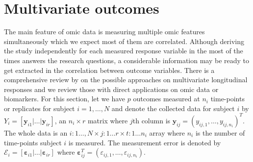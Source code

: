 \documentclass[]{article}
\begin{document}
		
		\section{Multivariate outcomes}
		The main feature of omic data is measuring multiple omic features simultaneously which we expect most of them are correlated. Although deriving the study independently for each measured response variable in the most of the times answers the research questions, a considerable information may be ready to get extracted in the correlation between outcome variables. There is a comprehensive review by \cite{VerbekeetalReview2014} on the possible approaches on multivariate longitudinal responses and we review those with direct applications on omic data or biomarkers. For this section, let we have $p$ outcomes measured at $n_i$ time-points or replicates for subject $i=1,\ldots,N$ and denote the collected data for subject $i$ by $Y_i=\left[\mathbf{y}_{i1}|\ldots|\mathbf{y}_{ir}\right]$, an $n_i\times r$ matrix where $j$th column is $\mathbf{y}_{ij}=\left(y_{ij,1},\ldots,y_{ij,n_i}\right)^T$. The whole data is an $i:1\ldots,N\times j:1\ldots r\times t:1\ldots n_i$ array where $n_i$ is the number of time-points subject $i$ is measured. The measurement error is denoted by $\mathcal{E}_i=\left[\boldsymbol{\varepsilon}_{i1}|\ldots|\boldsymbol{\varepsilon}_{ir}\right]$ where 
		$\boldsymbol{\varepsilon}_{ij}^T=\left(\varepsilon_{ij,1},\ldots,\varepsilon_{ij,n_i}\right)$.
		
\end{document}
